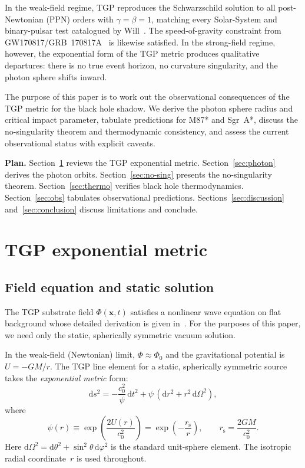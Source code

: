 \documentclass[11pt,a4paper]{article}
\theoremstyle{definition}
\theoremstyle{remark}
\newcommand{\PhiZero}{\varPhi_0}
\newcommand{\rs}{r_{\mathrm{s}}}
\newcommand{\dd}{\mathrm{d}}
\renewcommand{\Phi}{\varPhi}
\begin{document}
In the weak-field regime, TGP reproduces the Schwarzschild solution to
all post-Newtonian (PPN) orders with $\gamma = \beta = 1$, matching every
Solar-System and binary-pulsar test catalogued by
Will~\cite{Will2014}.  The speed-of-gravity constraint from
GW170817/GRB~170817A~\cite{Baker2017} is likewise satisfied.  In the
strong-field regime, however, the exponential form of the TGP metric
produces qualitative departures: there is no true event horizon, no
curvature singularity, and the photon sphere shifts inward.

The purpose of this paper is to work out the observational consequences
of the TGP metric for the black hole shadow.  We derive the photon
sphere radius and critical impact parameter, tabulate predictions for
M87* and Sgr~A*, discuss the no-singularity theorem and thermodynamic
consistency, and assess the current observational status with explicit
caveats.

\medskip\noindent\textbf{Plan.}
Section~\ref{sec:metric} reviews the TGP exponential metric.
Section~\ref{sec:photon} derives the photon orbits.
Section~\ref{sec:no-sing} presents the no-singularity theorem.
Section~\ref{sec:thermo} verifies black hole thermodynamics.
Section~\ref{sec:obs} tabulates observational predictions.
Sections~\ref{sec:discussion} and~\ref{sec:conclusion} discuss
limitations and conclude.

\section{TGP exponential metric}\label{sec:metric}

\subsection{Field equation and static solution}

The TGP substrate field $\Phi(\mathbf{x},t)$ satisfies a nonlinear wave
equation on flat background whose detailed derivation is given
in~\cite{Serafin2026-full,Serafin2026-nbody}.  For the purposes of this
paper, we need only the static, spherically symmetric vacuum solution.

In the weak-field (Newtonian) limit, $\Phi \approx \PhiZero$ and the
gravitational potential is $U = -GM/r$.  The TGP line element for a
static, spherically symmetric source takes the \emph{exponential metric}
form:
\begin{equation}\label{eq:exp-metric}
  \boxed{
    \dd s^2
    = -\frac{c_0^2}{\psi}\,\dd t^2
    + \psi\,(\dd r^2 + r^2\,\dd\Omega^2),
  }
\end{equation}
where
\begin{equation}\label{eq:psi-def}
  \psi(r) \equiv \exp\!\left(\frac{2U(r)}{c_0^2}\right)
  = \exp\!\left(-\frac{\rs}{r}\right),
  \qquad
  \rs = \frac{2GM}{c_0^2}.
\end{equation}
Here $\dd\Omega^2 = \dd\theta^2 + \sin^2\!\theta\,\dd\varphi^2$ is the
standard unit-sphere element.  The isotropic radial coordinate~$r$ is
used throughout.
\end{document}
